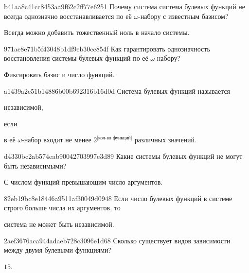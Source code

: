\begin{note}{b41aa8c41cc8453aa9f62c2ff77e6251}
    Почему система система булевых функций не всегда однозначно восстанавливается по её \({ \omega }\)-набору с известным базисом?

    \begin{cloze}{1}
        Всегда можно добавить тожественный ноль в начало системы.
    \end{cloze}
\end{note}

\begin{note}{971ae8e71b5f43048b1df9eb30cc854f}
    Как гарантировать однозначность восстановления системы булевых функций по её \({ \omega }\)-набору?

    \begin{cloze}{1}
        Фиксировать базис и число функций.
    \end{cloze}
\end{note}

\begin{note}{a1439a2e51b14886b00b692316b16d0d}
    Система булевых функций называется \begin{icloze}{2}независимой,\end{icloze} если \begin{icloze}{1}в её \({ \omega }\)-набор входит не менее \({ 2^{\text{[кол-во функций]}} }\) различных значений.\end{icloze}
\end{note}

\begin{note}{d4330bc2ab574eab90042703997e3d89}
    Какие системы булевых функций не могут быть независимыми?

    \begin{cloze}{1}
        С числом функций превышающим число аргументов.
    \end{cloze}
\end{note}

\begin{note}{82eb19bc8e18446a9511af30049d0948}
    Если число булевых функций в системе строго больше числа их аргументов, то \begin{icloze}{1}система не может быть независимой.\end{icloze}
\end{note}

\begin{note}{2aef3676aca944adaeb728c3096e1d68}
    Сколько существует видов зависимости между двумя булевыми функциями?

    \begin{cloze}{1}
        \({ 15 }\).
    \end{cloze}
\end{note}

